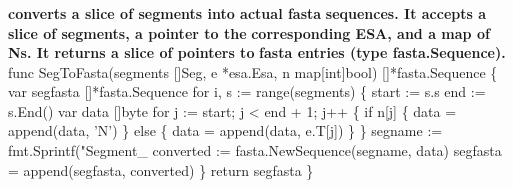\subsubsection{}
\textbf{ converts a slice of segments into actual fasta}
\textbf{sequences. It accepts a slice of segments, a pointer to the}
\textbf{corresponding ESA, and a map of Ns. It returns a slice of pointers to}
\textbf{fasta entries (type fasta.Sequence).}
\nwenddocs{}\endmoddef\nwstartdeflinemarkup{}\nwenddeflinemarkup
func SegToFasta(segments []Seg,
          e *esa.Esa,
          n map[int]bool) []*fasta.Sequence \{
          var segfasta []*fasta.Sequence
          for i, s := range(segments) \{
                  start := s.s
                  end := s.End()
                  var data []byte
                  for j := start; j < end + 1; j++ \{
                          if n[j] \{
                                  data = append(data, 'N')
                          \} else \{
                                  data = append(data, e.T[j])
                          \}
                  \}
          segname := fmt.Sprintf("Segment_%
          converted := fasta.NewSequence(segname, data)
          segfasta = append(segfasta, converted)                
          \}
          return segfasta
\}
\nwendcode{}

